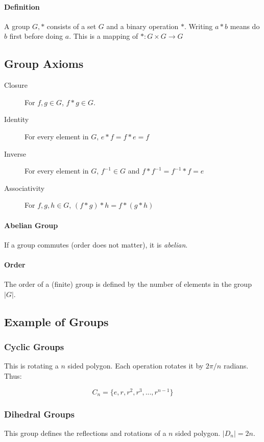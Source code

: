 \documentclass[12pt]{article}
\begin{document}
\paragraph{Definition}
A group ${G,*}$ consists of a set $G$ and a binary operation $*$. Writing $a*b$ means do $b$ first before doing $a$. This is a mapping of $*:G\times G\to G$
\subsection{Group Axioms}
\begin{description}
\item [Closure] For $f,g \in G$, $f*g \in G$.
\item [Identity] For every element in $G$, $e * f = f* e = f$
\item [Inverse] For every element in $G$, $f^{-1} \in G$ and $f*f^{-1} = f^{-1}*f =e$
\item [Associativity] For $f,g,h\in G$, \(
(f * g)*h = f*(g*h)\)
\end{description}

\paragraph{Abelian Group} If a group commutes (order does not matter), it is \textit{abelian}.

\paragraph{Order} The order of a (finite) group is defined by the number of elements in the group $|G|$. 

\subsection{Example of Groups}

\subsubsection{Cyclic Groups}
This is rotating a $n$ sided polygon. Each operation rotates it by $2\pi/n$ radians. Thus:

\[ C_n = \{e,r,r^2,r^3,...,r^{n-1}\}\]

\subsubsection{Dihedral Groups}
This group defines the reflections and rotations of a $n$ sided polygon. $|D_n| = 2n$.
\end{document}
